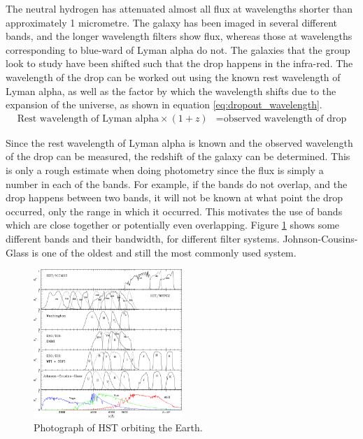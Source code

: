 		The neutral hydrogen has attenuated almost all flux at wavelengths shorter than approximately 1 micrometre. The galaxy has been imaged in several different bands, and the longer wavelength filters show flux, whereas those at wavelengths corresponding to blue-ward of Lyman alpha do not. The galaxies that the group look to study have been shifted such that the drop happens in the infra-red. The wavelength of the drop can be worked out using the known rest wavelength of Lyman alpha, as well as the factor by which the wavelength shifts due to the expansion of the universe, as shown in equation \ref{eq:dropout_wavelength}.
		\begin{align}
			\text{Rest wavelength of Lyman alpha} \times (1+z) &= \text{observed wavelength of drop}\label{eq:dropout_wavelength}
		\end{align}

		Since the rest wavelength of Lyman alpha is known and the observed wavelength of the drop can be measured, the redshift of the galaxy can be determined. This
		is only a rough estimate when doing photometry since the flux is simply a number in each of the bands. For example, if the bands do not overlap, and the drop happens between two bands, it will not be known at what point the drop occurred, only the range in which it occurred. This motivates the use of bands which are close together or potentially even overlapping. Figure \ref{fig:filter-systems} shows some different bands and their bandwidth, for different filter systems. Johnson-Cousins- Glass is one of the oldest and still the most commonly used system\cite{BasicObservationalKnowledge}.
		\begin{figure}[ht]
			\centering
			\includegraphics[width=0.5\textwidth]{../Images/filter-systems.png}
			\caption{Photograph of HST orbiting the Earth.\cite{refId0}\label{fig:filter-systems}}
		\end{figure}

